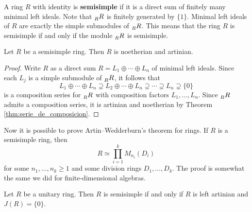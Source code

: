 
A ring $R$ with identity is \textbf{semisimple} if it is a direct sum of finitely many minimal left ideals. Note
that $\prescript{}{R}{R}$ is finitely generated by $\{1\}$. Minimal left ideals of $R$ 
are exactly the simple submodules of $\prescript{}{R}{R}$. 
This means that 
the ring $R$ is semisimple if and only if the module
$\prescript{}{R}{R}$ is semisimple.  

\begin{proposition}
    Let $R$ be a semisimple ring. Then $R$ is noetherian and artinian.
\end{proposition}

\begin{proof}
    Write $R$ as a direct sum $R=L_1\oplus\cdots\oplus L_n$ of minimal left ideals. Since 
    each $L_j$ is a simple submodule of $\prescript{}{R}{R}$, it follows that 
    \[
    L_1\oplus\cdots\oplus L_n\supsetneq L_2\oplus\cdots\oplus L_n\supsetneq\cdots\supsetneq L_n\supsetneq\{0\}
    \]
    is a composition series for $\prescript{}{R}{R}$ with composition factors
    $L_1,\dots,L_n$. Since $\prescript{}{R}{R}$ admits a composition
    series, it is artinian and noetherian by Theorem \ref{thm:serie_de_composicion}.
\end{proof}

Now it is possible to prove Artin--Wedderburn's theorem for rings. 
If $R$ is a semisimple ring, then
\[
R\simeq \prod_{i=1}^k M_{n_i}(D_i)
\]
for some $n_1,\dots,n_k\geq1$ and some
division rings $D_1,\dots,D_k$. 
The proof is somewhat
the same we did for finite-dimensional algebras.

\begin{theorem}
	\label{thm:SSartin=J}
	Let $R$ be a unitary ring. Then $R$ is semisimple if and only if 
	$R$ is left artinian and $J(R)=\{0\}$.
\end{theorem}

